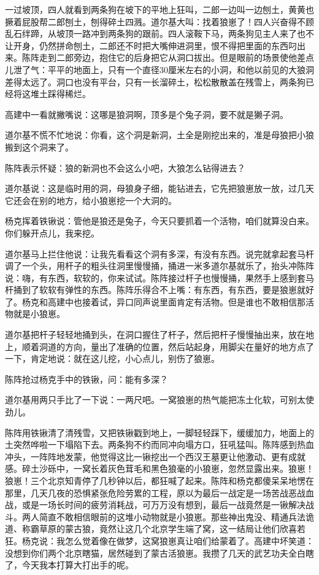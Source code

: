 \par 一过坡顶，四人就看到两条狗在坡下的平地上狂叫，二郎一边叫一边刨土，黄黄也撅着屁股帮二郎刨土，刨得碎土四溅。道尔基大叫：找着狼崽了！四人兴奋得不顾乱石绊蹄，从坡顶一路冲到两条狗的跟前。四人滚鞍下马，两条狗见主人来了也不让开身，仍然拼命刨土，二郎还不时把大嘴伸进洞里，恨不得把里面的东西叼出来。陈阵走到二郎旁边，抱住它的后身把它从洞口拔出。但是眼前的场景使他差点儿泄了气：平平的地面上，只有一个直径30厘米左右的小洞，和他以前见的大狼洞差得太远了。洞口也没有平台，只有一长溜碎土，松松散散盖在残雪上，两条狗已经将这堆土踩得稀烂。
\par 高建中一看就撇嘴说：这哪是狼洞啊，顶多是个兔子洞，要不就是獭子洞。
\par 道尔基不慌不忙地说：你看，这个洞是新洞，土全是刚挖出来的，准是母狼把小狼搬到这个洞来了。
\par 陈阵表示怀疑：狼的新洞也不会这么小吧，大狼怎么钻得进去？
\par 道尔基说：这是临时用的洞，母狼身子细，能钻进去，它先把狼崽放一放，过几天它还会在别的地方，给小狼崽挖一个大洞的。
\par 杨克挥着铁锹说：管他是狼还是兔子，今天只要抓着一个活物，咱们就算没白来。你们躲开点儿，我来挖。
\par 道尔基马上拦住他说：让我先看看这个洞有多深，有没有东西。说完就拿起套马杆调了一个头，用杆子的粗头往洞里慢慢捅，捅进一米多道尔基就乐了，抬头冲陈阵说：嗨，有东西，软软的，你来试试。陈阵接过杆子也慢慢捅，果然手上感到套马杆捅到了软软有弹性的东西。陈阵乐得合不上嘴：有东西，有东西，要是狼崽就好了。杨克和高建中也接着试，异口同声说里面肯定有活物。但是谁也不敢相信那活物就是小狼崽。
\par 道尔基把杆子轻轻地捅到头，在洞口握住了杆子，然后把杆子慢慢抽出来，放在地上，顺着洞道的方向，量出了准确的位置，然后站起身，用脚尖在量好的地方点了一下，肯定地说：就在这儿挖，小心点儿，别伤了狼崽。
\par 陈阵抢过杨克手中的铁锹，问：能有多深？
\par 道尔基用两只手比了一下说：一两尺吧。一窝狼崽的热气能把冻土化软，可别太使劲儿。
\par 陈阵用铁锹清了清残雪，又把铁锹戳到地上，一脚轻轻踩下，缓缓加力，地面上的土突然哗啦一下塌陷下去。两条狗不约而同冲向塌方口，狂吼猛叫。陈阵感到热血冲头，一阵阵地发蒙，他觉得这比一锹挖出一个西汉王墓更让他激动、更有成就感。碎土沙砾中，一窝长着灰色茸毛和黑色狼毫的小狼崽，忽然显露出来。狼崽！狼崽！三个北京知青停了几秒钟以后，都狂喊了起来。陈阵和杨克都傻呆呆地愣在那里，几天几夜的恐惧紧张危险劳累的工程，原以为最后一战定是一场苦战恶战血战，或是一场长时间的疲劳消耗战，可万万没有想到，最后一战竟然是一锹解决战斗。两人简直不敢相信眼前的这堆小动物就是小狼崽。那些神出鬼没、精通兵法诡道、称霸草原的蒙古狼，竟然让这几个北京学生端了窝，这一结局让他们欣喜若狂。杨克说：我怎么觉着像在做梦，这窝狼崽真让咱们给蒙着了。高建中坏笑道：没想到你们两个北京瞎猫，居然碰到了蒙古活狼崽。我攒了几天的武艺功夫全白瞎了，今天我本打算大打出手的呢。

